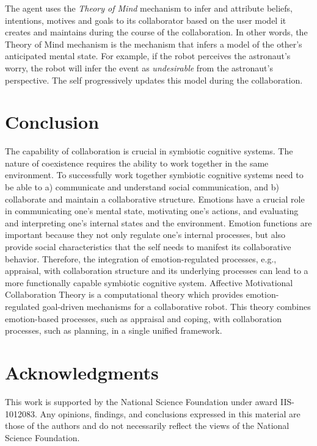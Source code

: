\documentclass[letterpaper]{article}
\begin{document}
The agent uses the \textit{Theory of Mind} mechanism to infer and attribute
beliefs, intentions, motives and goals to its collaborator based on the user
model it creates and maintains during the course of the collaboration. In
other words, the Theory of Mind mechanism is the mechanism that infers a model
of the other's anticipated mental state. For example, if the robot perceives
the astronaut's worry, the robot will infer the event as \textit{undesirable}
from the astronaut's perspective. The self progressively updates this model
during the collaboration.

\vspace*{-6mm}
\section{Conclusion}
\vspace*{-1mm}
The capability of collaboration is crucial in symbiotic cognitive systems. The
nature of coexistence requires the ability to work together in the same
environment. To successfully work together symbiotic cognitive systems need to
be able to a) communicate and understand social communication, and b)
collaborate and maintain a collaborative structure. Emotions have a crucial role
in communicating one's mental state, motivating one's actions, and evaluating
and interpreting one's internal states and the environment. Emotion functions
are important because they not only regulate one's internal processes, but also
provide social characteristics that the self needs to manifest its collaborative
behavior. Therefore, the integration of emotion-regulated processes, e.g.,
appraisal, with collaboration structure and its underlying processes can lead to
a more functionally capable symbiotic cognitive system. Affective Motivational
Collaboration Theory is a computational theory which provides emotion-regulated
goal-driven mechanisms for a collaborative robot. This theory combines
emotion-based processes, such as appraisal and coping, with collaboration
processes, such as planning, in a single unified framework.

\vspace*{-3mm}
\section*{Acknowledgments}
\vspace*{-1mm}
This work is supported by the National Science Foundation under award
IIS-1012083. Any opinions, findings, and conclusions expressed in this material
are those of the authors and do not necessarily reflect the views of the
National Science Foundation.
\vspace*{-6mm}



\end{document}

